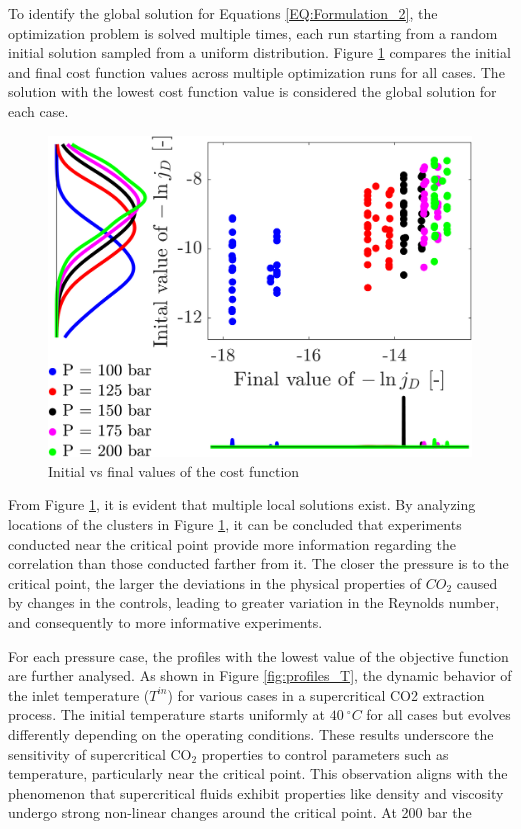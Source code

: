 \documentclass[../Article_Sensitivity_Analsysis.tex]{subfiles}
\begin{document}
	To identify the global solution for Equations \ref{EQ:Formulation_2}, the optimization problem is solved multiple times, each run starting from a random initial solution sampled from a uniform distribution. Figure \ref{fig:scatter} compares the initial and final cost function values across multiple optimization runs for all cases. The solution with the lowest cost function value is considered the global solution for each case.
	
	\begin{figure}[h!]
		\centering
		\includegraphics[width=\columnwidth]{Figures/Results/scatter.png}	
		\caption{Initial vs final values of the cost function}
		\label{fig:scatter}
	\end{figure}
	
	From Figure \ref{fig:scatter}, it is evident that multiple local solutions exist. By analyzing locations of the clusters in Figure \ref{fig:scatter}, it can be concluded that experiments conducted near the critical point provide more information regarding the correlation than those conducted farther from it. The closer the pressure is to the critical point, the larger the deviations in the physical properties of $CO_2$ caused by changes in the controls, leading to greater variation in the Reynolds number, and consequently to more informative experiments.
	
	For each pressure case, the profiles with the lowest value of the objective function are further analysed. As shown in Figure \ref{fig:profiles_T}, the dynamic behavior of the inlet temperature ($T^{in}$) for various cases in a supercritical CO2 extraction process. The initial temperature starts uniformly at $40~^\circ C$ for all cases but evolves differently depending on the operating conditions. These results underscore the sensitivity of supercritical CO$_2$ properties to control parameters such as temperature, particularly near the critical point. This observation aligns with the phenomenon that supercritical fluids exhibit properties like density and viscosity undergo strong non-linear changes around the critical point. At 200 bar the
\end{document}
